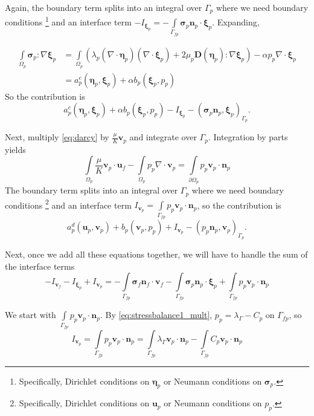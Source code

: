 \documentclass{article}
\newcommand{\mathspace}[1]{\ensuremath{#1}\xspace} %
\newcommand{\D}{\mathspace{\mathbf{D}}}
\newcommand{\sigmabf}{\mathspace{\boldsymbol{\sigma}}}
\newcommand{\grad}{\mathspace{\nabla}}
\renewcommand{\div}{\mathspace{\nabla \cdot}}
\newcommand{\darcy}{\mathspace{\Omega_{p}}}
\newcommand{\darcybdy}{\mathspace{\Gamma_{p}}}
\newcommand{\interface}{\mathspace{\Gamma_{fp}}}
\newcommand{\nf}{\mathspace{\mathbf{n}_f}}
\newcommand{\np}{\mathspace{\mathbf{n}_p}}
\newcommand{\intD}{\mathspace{\int \limits_{\darcy}}}
\newcommand{\intDbdyI}{\mathspace{\int \limits_{\partial \darcy}}}
\newcommand{\intI}{\mathspace{\int \limits_{\interface}}}
\newcommand{\uf}{\mathspace{\mathbf{u}_f}}
\newcommand{\vf}{\mathspace{\mathbf{v}_f}}
\newcommand{\up}{\mathspace{\mathbf{u}_p}}
\newcommand{\vp}{\mathspace{\mathbf{v}_p}}
\newcommand{\pp}{\mathspace{p_p}}
\newcommand{\disp}{\mathspace{\boldsymbol{\eta}_p}}
\newcommand{\disptest}{\mathspace{\boldsymbol{\xi}_p}}
\newcommand{\mult}{\mathspace{\lambda_{\Gamma}}}
\begin{document}
Again, the boundary term splits into an integral over \darcybdy where we need boundary conditions \footnote{Specifically, Dirichlet conditions on \disp or Neumann conditions on $\sigmabf_p$.} and an interface term $-I_{\disptest} = -\intI \sigmabf_p \np \cdot \disptest$. Expanding,

\begin{align*}
  \intD \sigmabf_p \colon \grad \disptest &=  \intD  \left ( \lambda_p (\div \disp)(\div \disptest)  + 2 \mu_p \D(\disp) \colon \grad \disptest \right)
                                            - \alpha \pp \div \disptest \\
                                          &= a^e_p(\disp, \disptest) + \alpha b_p(\disptest, \pp)
\end{align*}
So the contribution is $$a^e_p(\disp, \disptest) + \alpha b_p(\disptest, \pp) - I_{\disptest} - (\sigmabf_p\np, \disptest)_{\darcybdy}.$$

Next, multiply \eqref{eq:darcy} by $\frac {\mu} {K} \vp$ and integrate over \darcybdy. Integration by parts yields
$$ \intD \frac {\mu} {K} \vp \cdot \uf -  \intD \pp \div \vp = \intDbdyI \pp \vp \cdot \np$$ 
The boundary term splits into an integral over \darcybdy where we need boundary conditions \footnote{Specifically, Dirichlet conditions on \up or Neumann conditions on \pp.} and an interface term $I_{\vp} = \intI \pp \vp \cdot \np$, so the contribution is
$$a_p^d(\up, \vp) + b_p(\vp, \pp) + I_{\vp} - (\pp \np, \vp)_{\darcybdy}.$$

Next, once we add all these equations together, we will have to handle the sum of the interface terms $$-I_{\vf} - I_{\disptest} + I_{\vp} = -\intI \sigmabf_f \nf \cdot \vf -\intI \sigmabf_p \np \cdot \disptest + \intI \pp \vp \cdot \np$$

We start with $\intI \pp \vp \cdot \np$. By \eqref{eq:stressbalance1_mult}, $\pp = \mult - C_p$ on \interface, so
$$I_{\vp} = \intI \pp \vp \cdot \np = \intI \mult \vp \cdot \np - \intI C_p \vp \cdot \np$$
\end{document}
